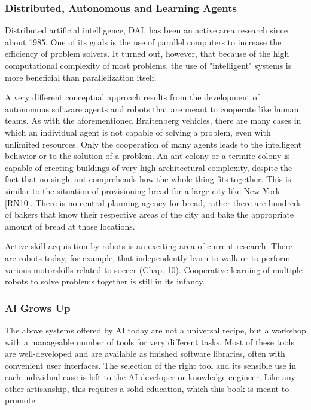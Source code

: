 \documentclass[10pt]{article}
\begin{document}
\subsubsection*{Distributed, Autonomous and Learning Agents}
Distributed artificial intelligence, DAI, has been an active area research since about 1985. One of its goals is the use of parallel computers to increase the efficiency of problem solvers. It turned out, however, that because of the high computational complexity of most problems, the use of "intelligent" systems is more beneficial than parallelization itself.

A very different conceptual approach results from the development of autonomous software agents and robots that are meant to cooperate like human teams. As with the aforementioned Braitenberg vehicles, there are many cases in which an individual agent is not capable of solving a problem, even with unlimited resources. Only the cooperation of many agents leads to the intelligent behavior or to the solution of a problem. An ant colony or a termite colony is capable of erecting buildings of very high architectural complexity, despite the fact that no single ant comprehends how the whole thing fits together. This is similar to the situation of provisioning bread for a large city like New York [RN10]. There is no central planning agency for bread, rather there are hundreds of bakers that know their respective areas of the city and bake the appropriate amount of bread at those locations.

Active skill acquisition by robots is an exciting area of current research. There are robots today, for example, that independently learn to walk or to perform\\
various motorskills related to soccer (Chap. 10). Cooperative learning of multiple robots to solve problems together is still in its infancy.

\subsubsection*{Al Grows Up}
The above systems offered by AI today are not a universal recipe, but a workshop with a manageable number of tools for very different tasks. Most of these tools are well-developed and are available as finished software libraries, often with convenient user interfaces. The selection of the right tool and its sensible use in each individual case is left to the AI developer or knowledge engineer. Like any other artisanship, this requires a solid education, which this book is meant to promote.
\end{document}
